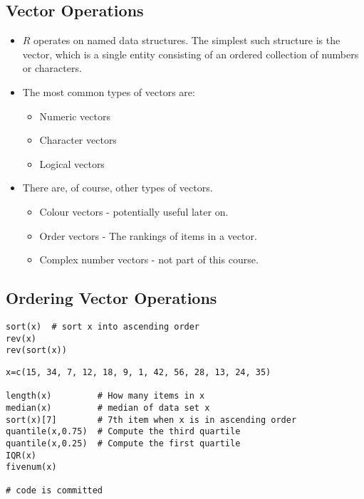 \documentclass[a4paper,12pt]{article}
\begin{document}
\begin{itemize}
\begin{itemize}
\section{Vector Operations}
\begin{itemize}
\item $R$ operates on named data structures. The simplest such
structure is the vector, which is a single entity consisting of an
ordered collection of numbers or characters.

\item The most common types of vectors are:
\begin{itemize}
\item Numeric vectors \item Character vectors \item Logical
vectors
\end{itemize}

\item There are, of course, other types of vectors.
\begin{itemize}
\item Colour vectors - potentially useful later on.
\item Order vectors - The rankings of items in a vector.
\item Complex number vectors - not part of this course.
\end{itemize}
\end{itemize}
\subsection{Ordering Vector Operations}
\begin{framed}
\begin{verbatim}
sort(x)  # sort x into ascending order
rev(x)
rev(sort(x))
\end{verbatim}
\end{framed}

\begin{framed}
\begin{verbatim}
x=c(15, 34, 7, 12, 18, 9, 1, 42, 56, 28, 13, 24, 35)

length(x)         # How many items in x
median(x)         # median of data set x
sort(x)[7]        # 7th item when x is in ascending order
quantile(x,0.75)  # Compute the third quartile
quantile(x,0.25)  # Compute the first quartile
IQR(x)            
fivenum(x)

# code is committed
\end{verbatim}
\end{framed}





\end{itemize}
\end{itemize}
\end{document}
